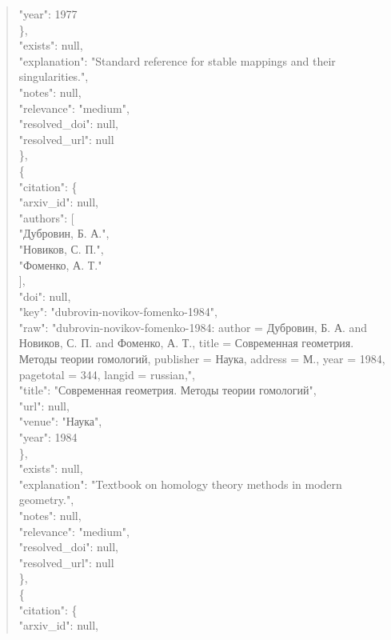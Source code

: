 \documentclass[11pt]{article}
\begin{document}
\begin{quote}
        "year": 1977\\
      \},\\
      "exists": null,\\
      "explanation": "Standard reference for stable mappings and their singularities.",\\
      "notes": null,\\
      "relevance": "medium",\\
      "resolved\_doi": null,\\
      "resolved\_url": null\\
    \},\\
    \{\\
      "citation": \{\\
        "arxiv\_id": null,\\
        "authors": [\\
          "Дубровин, Б. А.",\\
          "Новиков, С. П.",\\
          "Фоменко, А. Т."\\
        ],\\
        "doi": null,\\
        "key": "dubrovin-novikov-fomenko-1984",\\
        "raw": "dubrovin-novikov-fomenko-1984: author = Дубровин, Б. А. and Новиков, С. П. and Фоменко, А. Т., title = Современная геометрия. Методы теории гомологий, publisher = Наука, address = М., year = 1984, pagetotal = 344, langid = russian,",\\
        "title": "Современная геометрия. Методы теории гомологий",\\
        "url": null,\\
        "venue": "Наука",\\
        "year": 1984\\
      \},\\
      "exists": null,\\
      "explanation": "Textbook on homology theory methods in modern geometry.",\\
      "notes": null,\\
      "relevance": "medium",\\
      "resolved\_doi": null,\\
      "resolved\_url": null\\
    \},\\
    \{\\
      "citation": \{\\
        "arxiv\_id": null,\\

\end{quote}
\end{document}
